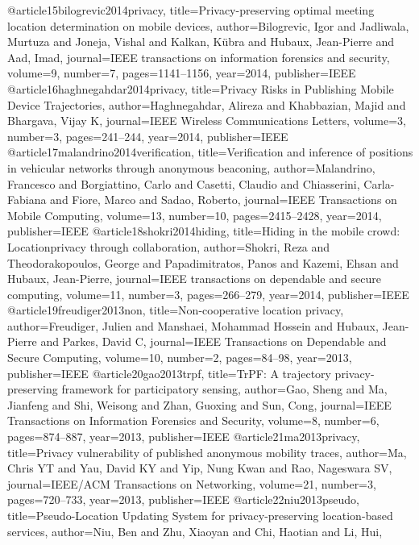 {{{{@article{15bilogrevic2014privacy,
	title={Privacy-preserving optimal meeting location determination on mobile devices},
	author={Bilogrevic, Igor and Jadliwala, Murtuza and Joneja, Vishal and Kalkan, K{\"u}bra and Hubaux, Jean-Pierre and Aad, Imad},
	journal={IEEE transactions on information forensics and security},
	volume={9},
	number={7},
	pages={1141--1156},
	year={2014},
	publisher={IEEE}
}
@article{16haghnegahdar2014privacy,
	title={Privacy Risks in Publishing Mobile Device Trajectories},
	author={Haghnegahdar, Alireza and Khabbazian, Majid and Bhargava, Vijay K},
	journal={IEEE Wireless Communications Letters},
	volume={3},
	number={3},
	pages={241--244},
	year={2014},
	publisher={IEEE}
}
@article{17malandrino2014verification,
	title={Verification and inference of positions in vehicular networks through anonymous beaconing},
	author={Malandrino, Francesco and Borgiattino, Carlo and Casetti, Claudio and Chiasserini, Carla-Fabiana and Fiore, Marco and Sadao, Roberto},
	journal={IEEE Transactions on Mobile Computing},
	volume={13},
	number={10},
	pages={2415--2428},
	year={2014},
	publisher={IEEE}
}
@article{18shokri2014hiding,
	title={Hiding in the mobile crowd: Locationprivacy through collaboration},
	author={Shokri, Reza and Theodorakopoulos, George and Papadimitratos, Panos and Kazemi, Ehsan and Hubaux, Jean-Pierre},
	journal={IEEE transactions on dependable and secure computing},
	volume={11},
	number={3},
	pages={266--279},
	year={2014},
	publisher={IEEE}
}
@article{19freudiger2013non,
	title={Non-cooperative location privacy},
	author={Freudiger, Julien and Manshaei, Mohammad Hossein and Hubaux, Jean-Pierre and Parkes, David C},
	journal={IEEE Transactions on Dependable and Secure Computing},
	volume={10},
	number={2},
	pages={84--98},
	year={2013},
	publisher={IEEE}
}
@article{20gao2013trpf,
	title={TrPF: A trajectory privacy-preserving framework for participatory sensing},
	author={Gao, Sheng and Ma, Jianfeng and Shi, Weisong and Zhan, Guoxing and Sun, Cong},
	journal={IEEE Transactions on Information Forensics and Security},
	volume={8},
	number={6},
	pages={874--887},
	year={2013},
	publisher={IEEE}
}
@article{21ma2013privacy,
	title={Privacy vulnerability of published anonymous mobility traces},
	author={Ma, Chris YT and Yau, David KY and Yip, Nung Kwan and Rao, Nageswara SV},
	journal={IEEE/ACM Transactions on Networking},
	volume={21},
	number={3},
	pages={720--733},
	year={2013},
	publisher={IEEE}
}
@article{22niu2013pseudo,
	title={Pseudo-Location Updating System for privacy-preserving location-based services},
	author={Niu, Ben and Zhu, Xiaoyan and Chi, Haotian and Li, Hui},
}}}}}
